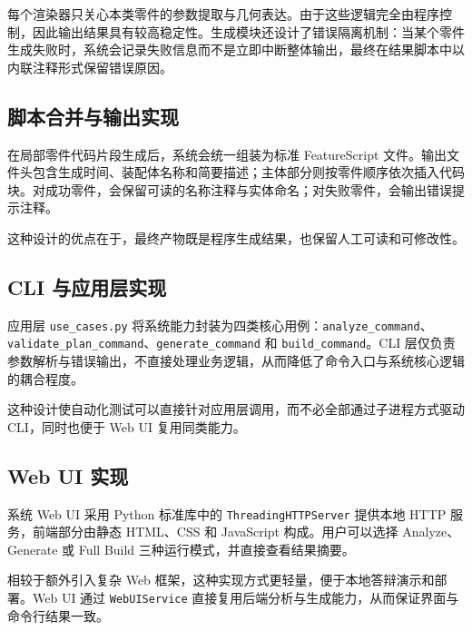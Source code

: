 每个渲染器只关心本类零件的参数提取与几何表达。由于这些逻辑完全由程序控制，因此输出结果具有较高稳定性。生成模块还设计了错误隔离机制：当某个零件生成失败时，系统会记录失败信息而不是立即中断整体输出，最终在结果脚本中以内联注释形式保留错误原因。

\subsection{脚本合并与输出实现}

在局部零件代码片段生成后，系统会统一组装为标准 FeatureScript 文件。输出文件头包含生成时间、装配体名称和简要描述；主体部分则按零件顺序依次插入代码块。对成功零件，会保留可读的名称注释与实体命名；对失败零件，会输出错误提示注释。

这种设计的优点在于，最终产物既是程序生成结果，也保留人工可读和可修改性。

\subsection{CLI 与应用层实现}

应用层 \texttt{use\_cases.py} 将系统能力封装为四类核心用例：\texttt{analyze\_command}、\texttt{validate\_plan\_command}、\texttt{generate\_command} 和 \texttt{build\_command}。CLI 层仅负责参数解析与错误输出，不直接处理业务逻辑，从而降低了命令入口与系统核心逻辑的耦合程度。

这种设计使自动化测试可以直接针对应用层调用，而不必全部通过子进程方式驱动 CLI，同时也便于 Web UI 复用同类能力。

\subsection{Web UI 实现}

系统 Web UI 采用 Python 标准库中的 \texttt{ThreadingHTTPServer} 提供本地 HTTP 服务，前端部分由静态 HTML、CSS 和 JavaScript 构成。用户可以选择 Analyze、Generate 或 Full Build 三种运行模式，并直接查看结果摘要。

相较于额外引入复杂 Web 框架，这种实现方式更轻量，便于本地答辩演示和部署。Web UI 通过 \texttt{WebUIService} 直接复用后端分析与生成能力，从而保证界面与命令行结果一致。
